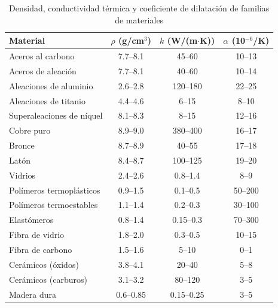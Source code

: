 \newpage

\begin{table}[htbp]
  \centering
  \small
  \caption{Densidad, conductividad térmica y coeficiente de dilatación de familias de materiales}
  \label{tab:prop_mat_fisicas_sin_costo}
  \begin{tabular}{@{} l c c c @{}}
    \toprule
    Material                  & $\rho$ (g/cm$^3$) & $k$ (W/(m$\cdot$K)) & $\alpha$ (10$^{-6}$/K) \\
    \midrule
    Aceros al carbono         & 7.7–8.1           & 45–60               & 10–13                  \\
    Aceros de aleación        & 7.7–8.1           & 40–60               & 10–14                  \\
    Aleaciones de aluminio    & 2.6–2.8           & 120–180             & 22–25                  \\
    Aleaciones de titanio     & 4.4–4.6           & 6–15                & 8–10                   \\
    Superaleaciones de níquel & 8.1–8.3           & 8–15                & 12–16                  \\
    Cobre puro                & 8.9–9.0           & 380–400             & 16–17                  \\
    Bronce                    & 8.7–8.9           & 40–55               & 17–18                  \\
    Latón                     & 8.4–8.7           & 100–125             & 19–20                  \\
    Vidrios                   & 2.4–2.6           & 0.8–1.4             & 8–9                    \\
    Polímeros termoplásticos  & 0.9–1.5           & 0.1–0.5             & 50–200                 \\
    Polímeros termoestables   & 1.1–1.4           & 0.2–0.3             & 30–100                 \\
    Elastómeros               & 0.8–1.4           & 0.15–0.3            & 70–300                 \\
    Fibra de vidrio           & 1.8–2.0           & 0.3–0.5             & 10–15                  \\
    Fibra de carbono          & 1.5–1.6           & 5–10                & 0–1                    \\
    Cerámicos (óxidos)        & 3.8–4.1           & 20–40               & 5–8                    \\
    Cerámicos (carburos)      & 3.1–3.2           & 80–120              & 3–5                    \\
    Madera dura               & 0.6–0.85          & 0.15–0.25           & 3–5                    \\
    \bottomrule
  \end{tabular}
\end{table}

